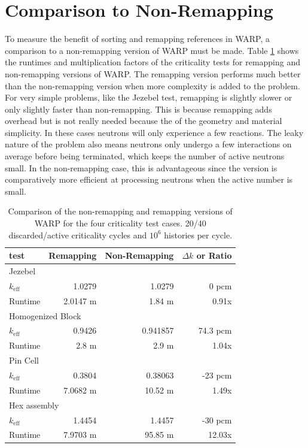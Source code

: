 \section{Comparison to Non-Remapping}

To measure the benefit of sorting and remapping references in WARP, a comparison to a non-remapping version of WARP must be made.  Table \ref{test_nonremapping_summary} shows the runtimes and multiplication factors of the criticality tests for remapping and non-remapping versions of WARP.  The remapping version performs much better than the non-remapping version when more complexity is added to the problem.  For very simple problems, like the Jezebel test, remapping is slightly slower or only slightly faster than non-remapping. This is because remapping adds overhead but is not really needed because the of the geometry and material simplicity. In these cases neutrons will only experience a few reactions.  %
The leaky nature of the problem also means neutrons only undergo a few interactions on average before being terminated, which keeps the number of active neutrons small. In the non-remapping case, this is advantageous since the version is comparatively more efficient at processing neutrons when the active number is small. %

\begin{table}[h]
\centering
\caption{Comparison of the non-remapping and remapping versions of WARP for the four criticality test cases.  20/40 discarded/active criticality cycles and $10^6$ histories per cycle.}
\label{test_nonremapping_summary}
\begin{tabular}{| l | r | r | r |}
 \hline
 test & Remapping  & Non-Remapping   & $\Delta k$ or Ratio  \\
\hline
\hline
\multicolumn{4}{|l|}{Jezebel}  \\
\hline
 $k_\mathrm{eff}$ & 1.0279 & 1.0279  & 0 pcm\\
 \hline
 Runtime               &   2.0147 m & 1.84 m & 0.91x \\
 \hline
 \hline
\multicolumn{4}{|l|}{Homogenized Block }\\
\hline
 $k_\mathrm{eff}$ & 0.9426 & 0.941857 & 74.3 pcm  \\
 \hline
 Runtime               &  2.8 m & 2.9 m & 1.04x \\
 \hline
  \hline
\multicolumn{4}{|l|}{Pin Cell}\\
\hline
 $k_\mathrm{eff}$ &  0.3804 & 0.38063  & -23 pcm \\
 \hline
 Runtime               & 7.0682 m & 10.52 m & 1.49x \\
 \hline
  \hline
\multicolumn{4}{|l|}{Hex assembly}\\
\hline
 $k_\mathrm{eff}$  & 1.4454  & 1.4457 & -30 pcm \\
 \hline
 Runtime               & 7.9703 m & 95.85 m & 12.03x \\
 \hline
\end{tabular}
\end{table}

